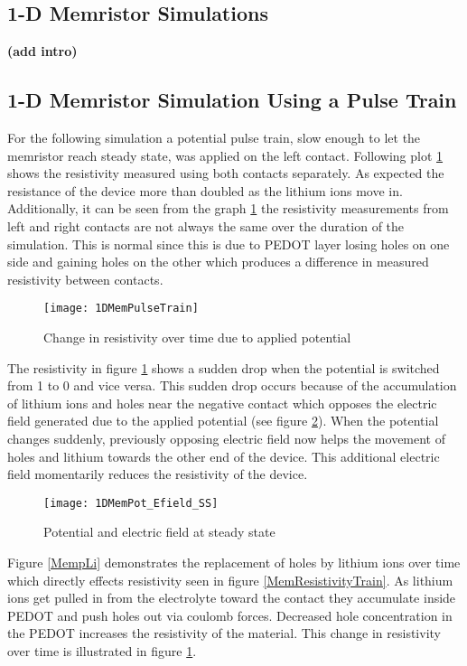 \begin{doublespace}
\clearpage
\section{1-D Memristor Simulations}
\textbf{(add intro)}
\subsection{1-D Memristor Simulation Using a Pulse Train}
  
For the following simulation a potential pulse train, slow enough to let the memristor reach steady state, was applied on the left contact. Following plot \ref{MemResTrain} shows the resistivity measured using both contacts separately. As expected the resistance of the device more than doubled as the lithium ions move in. Additionally, it can be seen from the graph \ref{MemResTrain} the resistivity measurements from left and right contacts are not always the same over the duration of the simulation. This is normal since this is due to PEDOT layer losing holes on one side and gaining holes on the other which produces a difference in measured resistivity between contacts. 

\begin{figure}[!htp]
\centering
\texttt{[image: 1DMemPulseTrain]}
\caption{Change in resistivity over time due to applied potential} 
\label{MemResTrain}
\end{figure}

The resistivity in figure \ref{MemResTrain} shows a sudden drop when the potential is switched from 1 to 0 and vice versa. This sudden drop occurs because of the accumulation of lithium ions and holes near the negative contact which opposes the electric field generated due to the applied potential (see figure \ref{MemEss}). When the potential changes suddenly, previously opposing electric field now helps the movement of holes and lithium towards the other end of the device. This additional electric field momentarily reduces the resistivity of the device.

\begin{figure}[!htp]
\centering
\texttt{[image: 1DMemPot\_Efield\_SS]}
\caption{Potential and electric field at steady state} 
\label{MemEss}
\end{figure}



Figure \ref{MempLi} demonstrates the replacement of holes by lithium ions over time which directly effects resistivity seen in figure \ref{MemResistivityTrain}.  As lithium ions get pulled in from the electrolyte toward the contact they accumulate inside PEDOT and push holes out via coulomb forces. Decreased hole concentration in the PEDOT increases the resistivity of the material. This change in resistivity over time is illustrated in figure \ref{MemResTrain}.


\end{doublespace}
